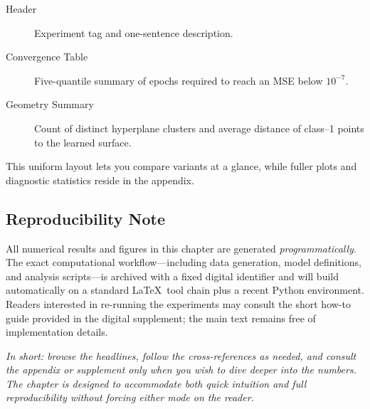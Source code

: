 \begin{description}
  \item[Header] Experiment tag and one-sentence description.
  \item[Convergence Table]   Five-quantile summary of epochs required to reach
        an MSE below \(10^{-7}\).
  \item[Geometry Summary]  Count of distinct hyperplane clusters and average
        distance of class--1 points to the learned surface.
\end{description}

This uniform layout lets you compare variants at a glance, while fuller plots
and diagnostic statistics reside in the appendix.

\subsection*{Reproducibility Note}

All numerical results and figures in this chapter are generated
\emph{programmatically}.  The exact computational workflow—including data
generation, model definitions, and analysis scripts—is archived with a fixed
digital identifier and will build automatically on a standard \LaTeX\ tool
chain plus a recent Python environment.  Readers interested in re-running the
experiments may consult the short how-to guide provided in the digital
supplement; the main text remains free of implementation details.

\bigskip
\noindent
\textit{In short: browse the headlines, follow the cross-references as needed,
and consult the appendix or supplement only when you wish to dive deeper into
the numbers.  The chapter is designed to accommodate both quick intuition and
full reproducibility without forcing either mode on the reader.}
